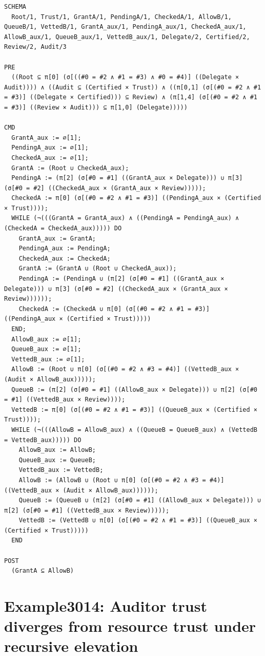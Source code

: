 \documentclass[10pt]{article}
\begin{document}
\begin{Verbatim}[fontsize=\tiny,breaklines=true,breakanywhere=true,frame=single,framesep=1.5mm]
SCHEMA
  Root/1, Trust/1, GrantA/1, PendingA/1, CheckedA/1, AllowB/1, QueueB/1, VettedB/1, GrantA_aux/1, PendingA_aux/1, CheckedA_aux/1, AllowB_aux/1, QueueB_aux/1, VettedB_aux/1, Delegate/2, Certified/2, Review/2, Audit/3

PRE
  ((Root ⊆ π[0] (σ[((#0 = #2 ∧ #1 = #3) ∧ #0 = #4)] ((Delegate × Audit)))) ∧ ((Audit ⊆ (Certified × Trust)) ∧ ((π[0,1] (σ[(#0 = #2 ∧ #1 = #3)] ((Delegate × Certified))) ⊆ Review) ∧ (π[1,4] (σ[(#0 = #2 ∧ #1 = #3)] ((Review × Audit))) ⊆ π[1,0] (Delegate)))))

CMD
  GrantA_aux := ∅[1];
  PendingA_aux := ∅[1];
  CheckedA_aux := ∅[1];
  GrantA := (Root ∪ CheckedA_aux);
  PendingA := (π[2] (σ[#0 = #1] ((GrantA_aux × Delegate))) ∪ π[3] (σ[#0 = #2] ((CheckedA_aux × (GrantA_aux × Review)))));
  CheckedA := π[0] (σ[(#0 = #2 ∧ #1 = #3)] ((PendingA_aux × (Certified × Trust))));
  WHILE (¬(((GrantA = GrantA_aux) ∧ ((PendingA = PendingA_aux) ∧ (CheckedA = CheckedA_aux))))) DO
    GrantA_aux := GrantA;
    PendingA_aux := PendingA;
    CheckedA_aux := CheckedA;
    GrantA := (GrantA ∪ (Root ∪ CheckedA_aux));
    PendingA := (PendingA ∪ (π[2] (σ[#0 = #1] ((GrantA_aux × Delegate))) ∪ π[3] (σ[#0 = #2] ((CheckedA_aux × (GrantA_aux × Review))))));
    CheckedA := (CheckedA ∪ π[0] (σ[(#0 = #2 ∧ #1 = #3)] ((PendingA_aux × (Certified × Trust)))))
  END;
  AllowB_aux := ∅[1];
  QueueB_aux := ∅[1];
  VettedB_aux := ∅[1];
  AllowB := (Root ∪ π[0] (σ[(#0 = #2 ∧ #3 = #4)] ((VettedB_aux × (Audit × AllowB_aux)))));
  QueueB := (π[2] (σ[#0 = #1] ((AllowB_aux × Delegate))) ∪ π[2] (σ[#0 = #1] ((VettedB_aux × Review))));
  VettedB := π[0] (σ[(#0 = #2 ∧ #1 = #3)] ((QueueB_aux × (Certified × Trust))));
  WHILE (¬(((AllowB = AllowB_aux) ∧ ((QueueB = QueueB_aux) ∧ (VettedB = VettedB_aux))))) DO
    AllowB_aux := AllowB;
    QueueB_aux := QueueB;
    VettedB_aux := VettedB;
    AllowB := (AllowB ∪ (Root ∪ π[0] (σ[(#0 = #2 ∧ #3 = #4)] ((VettedB_aux × (Audit × AllowB_aux))))));
    QueueB := (QueueB ∪ (π[2] (σ[#0 = #1] ((AllowB_aux × Delegate))) ∪ π[2] (σ[#0 = #1] ((VettedB_aux × Review)))));
    VettedB := (VettedB ∪ π[0] (σ[(#0 = #2 ∧ #1 = #3)] ((QueueB_aux × (Certified × Trust)))))
  END

POST
  (GrantA ⊆ AllowB)
\end{Verbatim}

\Needspace{0.45\textheight}

\section{Example3014: Auditor trust diverges from resource trust under recursive elevation}\label{case:Example3014}
\end{document}
